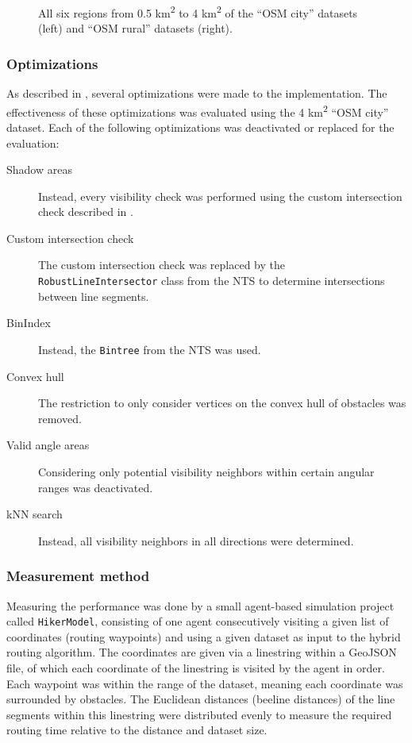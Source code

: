 \begin{figure}[h!]
\begin{minipage}[t]{.38\textwidth}
\begin{figcenter}
					\end{figcenter}
				\end{minipage}
				\caption[Areas of the \enquote{OSM city} and \enquote{OSM rural} datasets.]{All six regions from 0.5 km\textsuperscript{2} to 4 km\textsuperscript{2} of the \enquote{OSM city} datasets (left) and \enquote{OSM rural} datasets (right).}
			\end{figure}
		
		\subsubsection{Optimizations}
		
			As described in , several optimizations were made to the implementation.
			The effectiveness of these optimizations was evaluated using the 4 km\textsuperscript{2} \enquote{OSM city} dataset.
			Each of the following optimizations was deactivated or replaced for the evaluation:

			\begin{description}
				\item[Shadow areas] Instead, every visibility check was performed using the custom intersection check described in .
				\item[Custom intersection check] The custom intersection check was replaced by the \texttt{RobustLineIntersector} class from the NTS to determine intersections between line segments.
				\item[BinIndex] Instead, the \texttt{Bintree} from the NTS was used.
				\item[Convex hull] The restriction to only consider vertices on the convex hull of obstacles was removed.
				\item[Valid angle areas] Considering only potential visibility neighbors within certain angular ranges was deactivated.
				\item[kNN search] Instead, all visibility neighbors in all directions were determined.
			\end{description}		
			
		\subsubsection{Measurement method}
		
			Measuring the performance was done by a small agent-based simulation project called \texttt{HikerModel}, consisting of one agent consecutively visiting a given list of coordinates (routing waypoints) and using a given dataset as input to the hybrid routing algorithm.
			The coordinates are given via a linestring within a GeoJSON file, of which each coordinate of the linestring is visited by the agent in order.
			Each waypoint was within the range of the dataset, meaning each coordinate was surrounded by obstacles.
			The Euclidean distances (beeline distances) of the line segments within this linestring were distributed evenly to measure the required routing time relative to the distance and dataset size.
			
